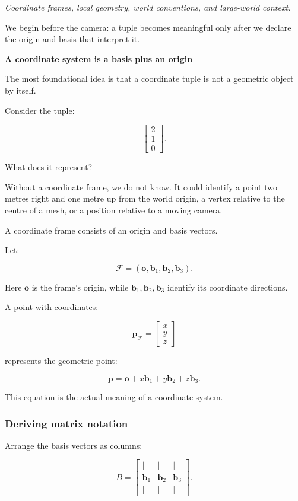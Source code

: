 \emph{Coordinate frames, local geometry, world conventions, and large-world context.}

We begin before the camera: a tuple becomes meaningful only after we declare the origin and basis that interpret it.

\textbf{A coordinate system is a basis plus an origin}

The most foundational idea is that a coordinate tuple is not a geometric object by itself.

Consider the tuple:

\[
 \begin{bmatrix}2\\1\\0\end{bmatrix}.
\]

What does it represent?

Without a coordinate frame, we do not know. It could identify a point two metres right and one metre up from the world origin, a vertex relative to the centre of a mesh, or a position relative to a moving camera.

A coordinate frame consists of an origin and basis vectors.

Let:

\[
 \mathcal F=(\mathbf o,\mathbf b_1,\mathbf b_2,\mathbf b_3).
\]

Here \(\mathbf o\) is the frame's origin, while \(\mathbf b_1,\mathbf b_2,\mathbf b_3\) identify its coordinate directions.

A point with coordinates:

\[
 \mathbf p_{\mathcal F}= \begin{bmatrix}x\\y\\z\end{bmatrix}
\]

represents the geometric point:

\[
 \boxed{ \mathbf p= \mathbf o+x\mathbf b_1+y\mathbf b_2+z\mathbf b_3 }.
\]

This equation is the actual meaning of a coordinate system.

\subsubsection{Deriving matrix notation}\label{deriving-matrix-notation}

Arrange the basis vectors as columns:

\[
 B= \begin{bmatrix} |&|&|\\ \mathbf b_1&\mathbf b_2&\mathbf b_3\\ |&|&| \end{bmatrix}.
\]

